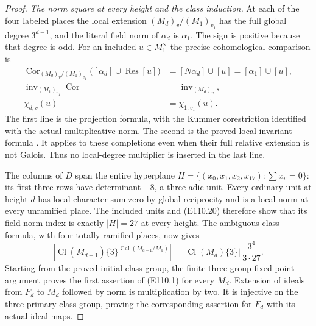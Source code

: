 \begin{proof}
\emph{The norm square at every height and the class induction.}
At each of the four labeled places the local extension
$(M_d)_v/(M_1)_{v_1}$ has the full global degree
$3^{d-1}$, and the literal field norm of $\alpha_d$ is $\alpha_1$.
The sign is positive because that degree is odd.
For an included $u\in M_1^\times$ the precise cohomological
comparison is
\[
 \begin{split}
 \operatorname{Cor}_{(M_d)_v/(M_1)_{v_1}}
   \bigl([\alpha_d]\cup\operatorname{Res}[u]\bigr)
       &=[N\alpha_d]\cup[u]=[\alpha_1]\cup[u],\\
 \operatorname{inv}_{(M_1)_{v_1}}\operatorname{Cor}
       &=\operatorname{inv}_{(M_d)_v},\\
                 \chi_{d,v}(u)&=\chi_{1,v_1}(u).
 \end{split}
 \tag{E110.20}
\]
The first line is the projection formula, with the Kummer
corestriction identified with the actual multiplicative norm.
The second is the proved local invariant formula
\cite[III, Section 2, formulas (29),(30), and Theorem 3.1]{E_MilneCFT}.
It applies to these completions even when their full relative
extension is not Galois. Thus no local-degree multiplier is
inserted in the last line.

The columns of $D$ span the entire hyperplane
$H=\{(x_0,x_1,x_2,x_{17}):\sum x_v=0\}$:
its first three rows have determinant $-8$, a three-adic unit.
Every ordinary unit at height $d$ has local character sum zero
by global reciprocity and is a local norm at every unramified
place. The included units and (E110.20) therefore show that its
field-norm index is exactly $|H|=27$ at every height.
The ambiguous-class formula, with four totally ramified places,
now gives
\[
 |\operatorname{Cl}(M_{d+1})\{3\}^{\operatorname{Gal}(M_{d+1}/M_d)}|
       =|\operatorname{Cl}(M_d)\{3\}|\,
                               \frac{3^4}{3\cdot27}.
 \tag{E110.21}
\]
Starting from the proved initial class group, the finite
three-group fixed-point argument proves the first assertion
of (E110.1) for every $M_d$.
Extension of ideals from $F_d$ to $M_d$ followed by norm is
multiplication by two. It is injective on the three-primary class
group, proving the corresponding assertion for $F_d$ with its
actual ideal maps.


\end{proof}
